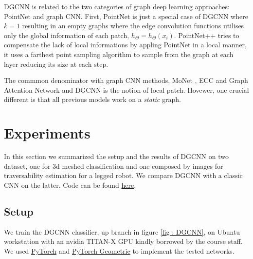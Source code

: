 \documentclass[twocolumn,showpacs,
  nofootinbib,aps,superscriptaddress,
  eqsecnum,prd,notitlepage,showkeys,10pt]{revtex4-1}
\begin{document}

DGCNN is related to the two categories of graph deep learning  approaches: PointNet and graph CNN.
First, PointNet is just a special case of DGCNN where $k=1$ resulting in an empty graphs where the edge convolution functions utilises only the global information of each patch, $h_{\Theta} = h_{\Theta}(x_i)$.
PointNet++ \cite{pointnet_plus} tries to compensate the lack of local informations by appling PointNet in a local manner, it uses a farthest point sampling algorithm to sample from the graph at each layer reducing its size at each step.

The commmon denominator with graph CNN methods, MoNet \cite{monet}, ECC \cite{ecc} and Graph Attention Network \cite{gat} and DGCNN is the notion of local patch. Hovewer, one crucial different is that all previous models work on a \emph{static} graph.


\section{Experiments}
In this section we summarized the setup and the results of DGCNN on two dataset, one for 3d meshed classification and one composed by images for traversability estimation for a legged robot. We compare DGCNN with a classic CNN on the latter. Code can be found \href{https://github.com/FrancescoSaverioZuppichini/GDL-project}{here}.
\subsection{Setup}
We train the DGCNN classifier, up branch in figure \ref{fig : DGCNN}, on Ubuntu workstation with an nvidia TITAN-X GPU kindly borrowed by the course staff. We used \href{https://pytorch.org/}{PyTorch} and \href{https://rusty1s.github.io/pytorch_geometric/build/html/index.html}{PyTorch Geometric} \cite{torch_geometric} to implement the tested networks. 
\end{document}
